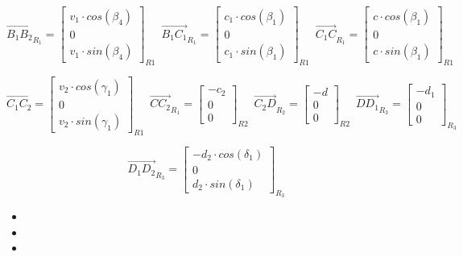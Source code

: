 \documentclass[12pt,a4paper]{article}
\begin{document}
\begin{equation}
\vec{B_1 B_2}_{R_{1}}=
\begin{bmatrix}
v_1\cdot cos(\beta_4) \\
0\\
v_1\cdot sin(\beta_4)
\end{bmatrix}_{R1} \enspace
\vec{B_1 C_1}_{R_{1}}=
\begin{bmatrix}
c_1\cdot cos(\beta_1) \\
0\\
c_1\cdot sin(\beta_1)
\end{bmatrix}_{R1} \enspace
\vec{C_1 C}_{R_{1}}=
\begin{bmatrix}
c\cdot cos(\beta_1) \\
0\\
c\cdot sin(\beta_1)
\end{bmatrix}_{R1} \enspace
\end{equation}

\begin{equation}
\vec{C_1 C_2}=
\begin{bmatrix}
v_2\cdot cos(\gamma_1) \\
0\\
v_2 \cdot sin(\gamma_1)
\end{bmatrix}_{R1} \enspace
\vec{C C_2}_{R_{1}}=
\begin{bmatrix}
-c_2\\
0\\
0
\end{bmatrix}_{R2} \enspace
\vec{C_2 D}_{R_2}=
\begin{bmatrix}
-d\\
0\\
0
\end{bmatrix}_{R2} \enspace
\vec{D D_1}_{R_3}=
\begin{bmatrix}
- d_1\\
0\\
0
\end{bmatrix}_{R_3} \enspace
\end{equation}

\begin{equation}
\vec{D_1 D_2}_{R_3}=
\begin{bmatrix}
-d_2 \cdot cos(\delta_1)\\
0\\
d_2 \cdot sin(\delta_1)
\end{bmatrix}_{R_3} \enspace
\end{equation}

\begin{itemize}
	\item
	\item 
	\item 
\end{itemize}
\end{document}

